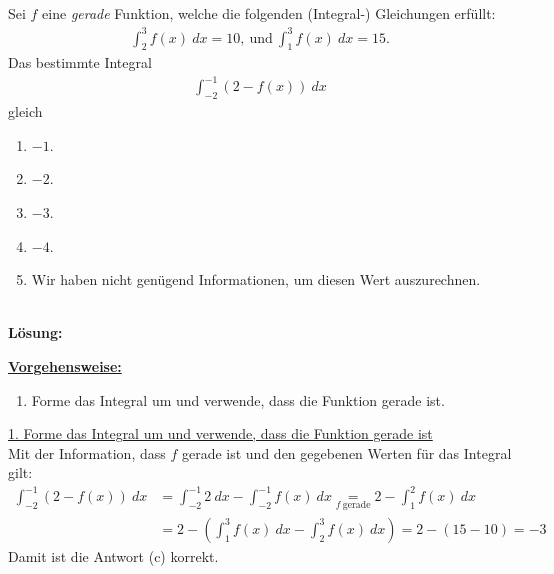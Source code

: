 \subsection*{}
Sei $ f $ eine \textit{gerade} Funktion, welche die folgenden (Integral-) Gleichungen erfüllt:
\begin{align*}
	\int_{2}^3 f(x) \ dx = 10, \ \textrm{und} \
	\int_1^3 f(x) \ dx = 15.
\end{align*}
Das bestimmte Integral
\begin{align*}
	\int_{-2}^{-1} (2 - f(x) ) \ dx
\end{align*}  
gleich
\renewcommand{\labelenumi}{(\alph{enumi})}
\begin{enumerate}
	\item 
	$ -1 $.
	\item
	$ -2 $.
	\item
	$ -3 $.
	\item
	$ -4 $.
	\item
	Wir haben nicht genügend Informationen, um diesen Wert auszurechnen.
\end{enumerate}
\ \\
\textbf{Lösung:}
\begin{mdframed}
\underline{\textbf{Vorgehensweise:}}
\renewcommand{\labelenumi}{\theenumi.}
\begin{enumerate}
\item Forme das Integral um und verwende, dass die Funktion gerade ist.
\end{enumerate}
\end{mdframed}

\underline{1. Forme das Integral um und verwende, dass die Funktion gerade ist}\\
Mit der Information, dass $f$ gerade ist und den gegebenen Werten für das Integral gilt:
\begin{align*}
	\int_{-2}^{-1} (2 - f(x) ) \ dx
	&=
	\int_{-2}^{-1} 2  \ dx
	-
	\int_{-2}^{-1} f(x) \ dx
	\underset{f \ \text{gerade}}{=}
	2
	-
	\int_{1}^{2} f(x) \ dx\\
	&=
	2 
	-
	\left(\int_{1}^{3} f(x) \ dx - \int_{2}^{3} f(x) \ dx\right)
	=
	2
	-
	(15 - 10)
	=-3
\end{align*}
Damit ist die Antwort (c) korrekt.

\newpage
